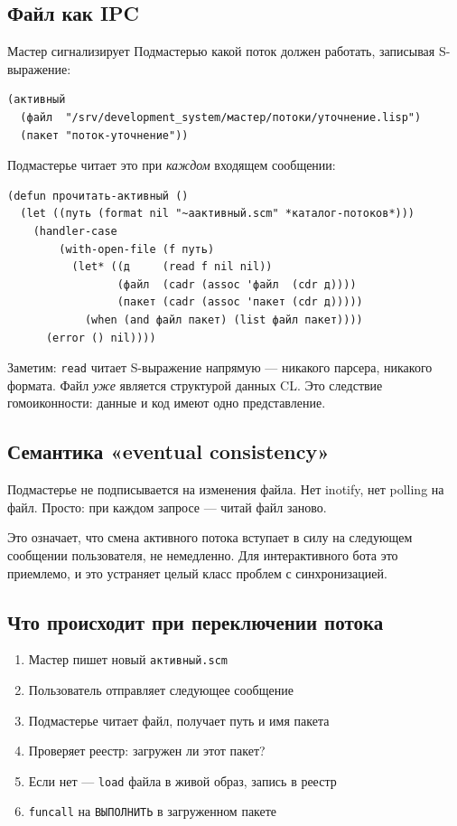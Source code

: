 \documentclass[11pt,a4paper]{article}
\begin{document}
\subsection{Файл как IPC}

Мастер сигнализирует Подмастерью какой поток должен работать, записывая S-выражение:

\begin{lstlisting}[caption={мастер/потоки/активный.scm}]
(активный
  (файл  "/srv/development_system/мастер/потоки/уточнение.lisp")
  (пакет "поток-уточнение"))
\end{lstlisting}

Подмастерье читает это при \textit{каждом} входящем сообщении:

\begin{lstlisting}[caption={подмастерье/main.lisp}]
(defun прочитать-активный ()
  (let ((путь (format nil "~aактивный.scm" *каталог-потоков*)))
    (handler-case
        (with-open-file (f путь)
          (let* ((д     (read f nil nil))
                 (файл  (cadr (assoc 'файл  (cdr д))))
                 (пакет (cadr (assoc 'пакет (cdr д)))))
            (when (and файл пакет) (list файл пакет))))
      (error () nil))))
\end{lstlisting}

Заметим: \texttt{read} читает S-выражение напрямую — никакого парсера, никакого формата. Файл \textit{уже} является структурой данных CL. Это следствие гомоиконности: данные и код имеют одно представление.

\subsection{Семантика «eventual consistency»}

Подмастерье не подписывается на изменения файла. Нет inotify, нет polling на файл. Просто: при каждом запросе — читай файл заново.

Это означает, что смена активного потока вступает в силу на следующем сообщении пользователя, не немедленно. Для интерактивного бота это приемлемо, и это устраняет целый класс проблем с синхронизацией.

\subsection{Что происходит при переключении потока}

\begin{enumerate}[noitemsep]
  \item Мастер пишет новый \texttt{активный.scm}
  \item Пользователь отправляет следующее сообщение
  \item Подмастерье читает файл, получает путь и имя пакета
  \item Проверяет реестр: загружен ли этот пакет?
  \item Если нет — \texttt{load} файла в живой образ, запись в реестр
  \item \texttt{funcall} на \texttt{ВЫПОЛНИТЬ} в загруженном пакете
\end{enumerate}
\end{document}
